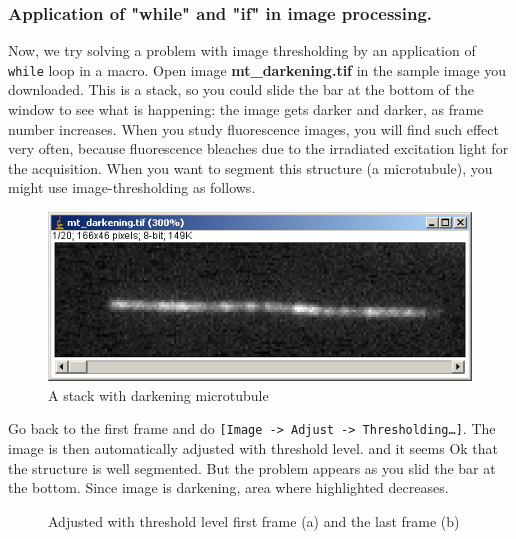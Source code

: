 \documentclass[11pt,a4paper,oneside]{report}
\newcommand{\ijmenu}[1]{\texttt{\small#1}}
\newcommand{\ilcom}[1]{\texttt{\small#1}}
\begin{document}
\subsubsection{Application of "while" and "if" in image processing.}
Now, we try solving a problem with image thresholding by an application of 
\ilcom{while} loop in a macro. Open image \textbf{mt\_darkening.tif} in the sample image you downloaded. 
This is a stack, so you could slide the bar at the bottom of the window to see what is happening: 
the image gets darker and darker, as frame number increases. When you study fluorescence images, 
you will find such effect very often, because fluorescence bleaches due to the irradiated excitation light 
for the acquisition. 
When you want to segment this structure (a microtubule), you might use image-thresholding as follows. 

\begin{figure}[htbp]
\begin{center}
\includegraphics[scale=0.6]{fig/fig23441_mtStack.png}
\caption{A stack with darkening microtubule}
\label{fig:MTstack}
\end{center}
\end{figure} 

Go back to the first frame and do \ijmenu{[Image -> Adjust -> Thresholding\ldots]}. The image is then automatically adjusted with threshold level. and it seems Ok that the structure is well segmented. But the problem appears as you slid the bar at the bottom. Since image is darkening, area where highlighted decreases. 

\begin{figure}[htbp]
 \centering
 \caption{Adjusted with threshold level first frame (a) and the last frame (b)}
 \label{fig:degradingThreshold}
\end{figure}
\end{document}

